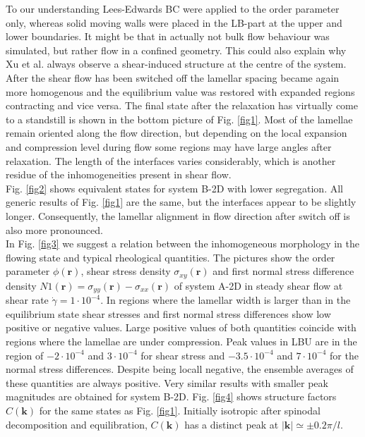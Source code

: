 \documentclass[8.5pt,twoside,twocolumn]{article}
\newcommand{\e}[1]{\cdot10^{#1}}
\begin{document}
To our understanding Lees-Edwards BC were applied to the order parameter only, whereas solid moving walls were placed in the LB-part at the upper and lower boundaries.
It might be that in \cite{Xu06b} actually not bulk flow behaviour was simulated, but rather flow in a confined geometry. 
This could also explain why Xu et al. always observe a shear-induced structure at the centre of the system.\\ 
After the shear flow has been switched off the lamellar spacing became again more homogenous and the equilibrium value was restored with expanded regions contracting and vice versa.
The final state after the relaxation has virtually come to a standstill is shown in the bottom picture of Fig. \ref{fig1}. 
Most of the lamellae remain oriented along the flow direction, but depending on the local expansion and compression level during flow some regions may have large angles after relaxation. 
The length of the interfaces varies considerably, which is another residue of the inhomogeneities present in shear flow.\\
Fig. \ref{fig2} shows equivalent states for system B-2D with lower segregation.
All generic results of Fig. \ref{fig1} are the same, but the interfaces appear to be slightly longer.
Consequently, the lamellar alignment in flow direction after switch off is also more pronounced.\\ 
In Fig. \ref{fig3} we suggest a relation between the inhomogeneous morphology in the flowing state and typical rheological quantities.
The pictures show the order parameter $\phi({\bm r})$, shear stress density $\sigma_{xy}({\bm r})$ and first normal stress difference density $N1({\bm r})=\sigma_{yy}({\bm r})-\sigma_{xx}({\bm r})$ of system A-2D in steady shear flow at shear rate $\dot{\gamma}=1\e{-4}$.
In regions where the lamellar width is larger than in the equilibrium state shear stresses and first normal stress differences show low positive or negative values.
Large positive values of both quantities coincide with regions where the lamellae are under compression.
Peak values in LBU are in the region of $-2\e{-4}$ and $3\e{-4}$ for shear stress and  $-3.5\e{-4}$ and $7\e{-4}$ for the normal stress differences.
Despite being locall negative, the ensemble averages of these quantities are always positive.
Very similar results with smaller peak magnitudes are obtained for system B-2D.
Fig. \ref{fig4} shows structure factors $C({\bm k})$ for the same states as Fig. \ref{fig1}.
Initially isotropic after spinodal decomposition and equilibration, $C({\bm k})$ has a distinct peak at $|{\bm k}|\simeq \pm0.2\pi/l$.
\end{document}
